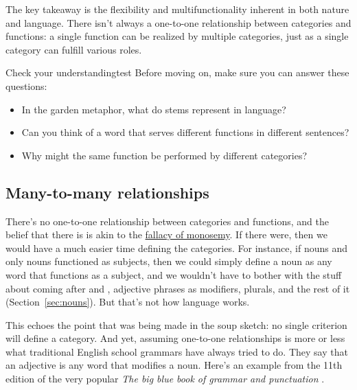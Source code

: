 The key takeaway is the flexibility and multifunctionality inherent in both nature and language. There isn't always a one-to-one relationship between categories and functions: a single function can be realized by multiple categories, just as a single category can fulfill various roles.

\begin{tblsframedsymbol}{Check your understanding}{test}
Before moving on, make sure you can answer these questions:
\begin{itemize}[noitemsep, leftmargin=*]
    \item In the garden metaphor, what do stems represent in language?
    \item Can you think of a word that serves different functions in different sentences?
    \item Why might the same function be performed by different categories?
\end{itemize}
\end{tblsframedsymbol}

\subsection{Many-to-many relationships} \label{sec:many-to-many}
There's no one-to-one relationship between categories and functions, and the belief that there is is akin to the \hyperref[sec:fallacy-of-monosemy]{fallacy of monosemy}. If there were, then we would have a much easier time defining the categories. For instance, if nouns and only nouns functioned as subjects, then we could simply define a noun as any word that functions as a subject, and we wouldn't have to bother with the stuff about coming after  and , adjective phrases as modifiers, plurals, and the rest of it (Section~\ref{sec:nouns}). But that's not how language works.

This echoes the point that was being made in the soup sketch: no single criterion will define a category. And yet, assuming one-to-one relationships is more or less what traditional English school grammars have always tried to do. They say that an adjective is any word that modifies a noun. Here's an example from the 11th edition of the very popular \textit{The big blue book of grammar and punctuation} \citep{straus2014}.

